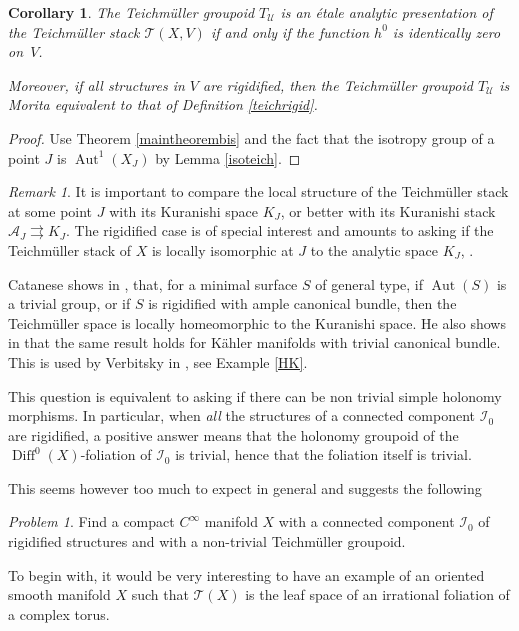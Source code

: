 \documentclass[JEP,XML,SOM,Unicode]{cedram}
\let\mathcal\mathscr
\DeclareMathOperator{\Aut}{Aut}
\DeclareMathOperator{\Diff}{Diff}
\theoremstyle{plain}
\newtheorem{corollary}[theorem]{Corollary}
\theoremstyle{definition}
\theoremstyle{remark}
\newtheorem{remark}[theorem]{Remark}
\newtheorem{problem}[theorem]{Problem}
\numberwithin{equation}{section}
\newcommand{\cI}{\mathcal{I}}
\begin{document}
\begin{corollary}
\label{etale?}
The Teichmüller groupoid $T_\mathcal U$ is an étale analytic presentation of the Teichmüller stack $\mathcal T(X,V)$ if and only if the function $h^0$ is identically zero on~$V$.

Moreover, if all structures in $V$ are rigidified, then the Teichmüller groupoid $T_\mathcal U$ is Morita equivalent to that of Definition \ref{teichrigid}.
\end{corollary}

\begin{proof}
Use Theorem \ref{maintheorembis} and the fact that the isotropy group of a point $J$ is $\Aut^1(X_J)$ by Lemma \ref{isoteich}.
\end{proof}

\begin{remark}
\label{Catanese}
It is important to compare the local structure of the Teichmüller stack at some point $J$ with its Kuranishi space $K_J$, or better with its Kuranishi stack $\mathcal A_J\rightrightarrows K_J$. The rigidified case is of special interest and amounts to asking if the Teichmüller stack of $X$ is locally isomorphic at $J$ to the analytic space $K_J$, \cf \cite{Catsurvey}.

Catanese shows in \cite[Th.\,45]{Catsurvey}, that, for a minimal surface $S$ of general type, if $\Aut(S)$ is a trivial group, or
if $S$ is rigidified with ample canonical bundle, then the Teichmüller space is locally homeomorphic to the Kuranishi space. He also shows in \cite[Prop.\,15]{Catsurvey} that the same result holds for Kähler manifolds with trivial canonical bundle. This is used by Verbitsky in \cite{Verbitsky}, see Example \ref{HK}.

This question is equivalent to asking if there can be non trivial simple holonomy morphisms. In particular, when \emph{all} the structures of a connected component $\cI_0$ are rigidified, a positive answer means that the holonomy groupoid of the $\Diff^0(X)$-foliation of $\cI_0$ is trivial, hence that the foliation itself is trivial.

This seems however too much to expect in general and suggests the following
\begin{problem}
\label{holonomyproblem}
Find a compact $C^\infty$ manifold $X$ with a connected component $\cI_0$ of rigidified structures and with a non-trivial Teichmüller groupoid.
\end{problem}
To begin with, it would be very interesting to have an example of an oriented smooth manifold $X$ such that $\mathcal T(X)$ is the leaf space of an irrational foliation of a complex torus.
\end{remark}
\end{document}
